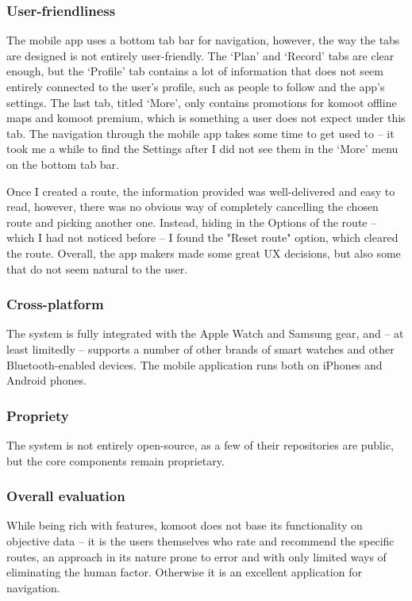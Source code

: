 \subsubsection*{User-friendliness}
The mobile app uses a bottom tab bar for navigation, however, the way the tabs are designed is not entirely user-friendly.
The `Plan' and `Record' tabs are clear enough, but the `Profile' tab contains a lot of information that does not seem entirely connected to the user's profile, such as people to follow and the app's settings.
The last tab, titled `More', only contains promotions for komoot offline maps and komoot premium, which is something a user does not expect under this tab.
The navigation through the mobile app takes some time to get used to -- it took me a while to find the Settings after I did not see them in the `More' menu on the bottom tab bar.

Once I created a route, the information provided was well-delivered and easy to read, however, there was no obvious way of completely cancelling the chosen route and picking another one.
Instead, hiding in the Options of the route -- which I had not noticed before -- I found the "Reset route" option, which cleared the route.
Overall, the app makers made some great UX decisions, but also some that do not seem natural to the user.
\subsubsection*{Cross-platform}
The system is fully integrated with the Apple Watch and Samsung gear, and -- at least limitedly -- supports a number of other brands of smart watches and other Bluetooth-enabled devices.
The mobile application runs both on iPhones and Android phones.
\subsubsection*{Propriety}
The system is not entirely open-source, as a few of their repositories are public, but the core components remain proprietary. \cite{komoot-github}

\subsubsection*{Overall evaluation}
While being rich with features, komoot does not base its functionality on objective data -- it is the users themselves who rate and recommend the specific routes,
an approach in its nature prone to error and with only limited ways of eliminating the human factor.
Otherwise it is an excellent application for navigation.


